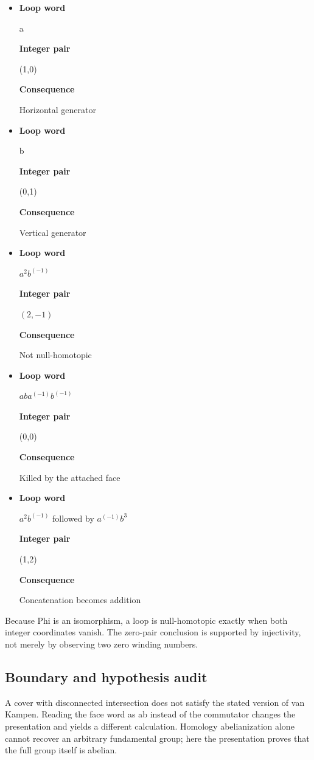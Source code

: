 \documentclass[preprint,12pt,aps,pra,showkeys,amsmath,amssymb,superscriptaddress,floatfix]{revtex4-2}
\theoremstyle{definition}
\theoremstyle{remark}
\begin{document}
\begin{itemize}
\item
  \textbf{Loop word}

  a

  \textbf{Integer pair}

  (1,0)

  \textbf{Consequence}

  Horizontal generator
\item
  \textbf{Loop word}

  b

  \textbf{Integer pair}

  (0,1)

  \textbf{Consequence}

  Vertical generator
\item
  \textbf{Loop word}

  \(a^{2}b^{(-1)}\)

  \textbf{Integer pair}

  \((2,-1)\)

  \textbf{Consequence}

  Not null-homotopic
\item
  \textbf{Loop word}

  \(aba^{(-1)}b^{(-1)}\)

  \textbf{Integer pair}

  (0,0)

  \textbf{Consequence}

  Killed by the attached face
\item
  \textbf{Loop word}

  \(a^{2}b^{(-1)}\) followed by \(a^{(-1)}b^{3}\)

  \textbf{Integer pair}

  (1,2)

  \textbf{Consequence}

  Concatenation becomes addition
\end{itemize}

Because Phi is an isomorphism, a loop is null-homotopic exactly when
both integer coordinates vanish. The zero-pair conclusion is supported
by injectivity, not merely by observing two zero winding numbers.

\subsection{Boundary and hypothesis audit}

A cover with disconnected intersection does not satisfy the stated
version of van Kampen. Reading the face word as ab instead of the
commutator changes the presentation and yields a different calculation.
Homology abelianization alone cannot recover an arbitrary fundamental
group; here the presentation proves that the full group itself is
abelian.
\end{document}
